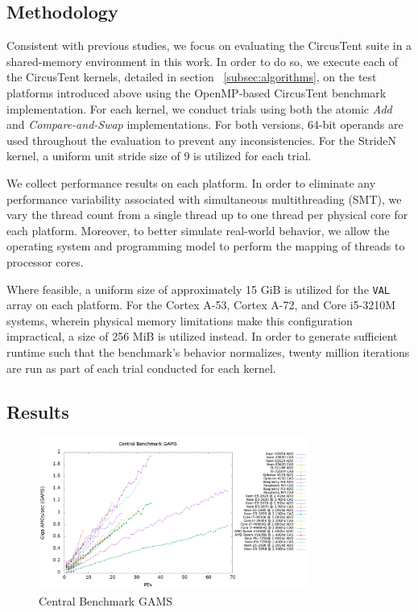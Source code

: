 
\subsection{Methodology}
\label{subsec:methodology}

Consistent with previous studies, we focus on evaluating the CircusTent suite in a shared-memory environment in this work\cite{}.
In order to do so, we execute each of the CircusTent kernels, detailed in section ~\ref{subsec:algorithms}, on the test platforms introduced above using the OpenMP-based CircusTent benchmark implementation. For each kernel, we conduct trials using both the atomic \textit{Add} and \textit{Compare-and-Swap} implementations.
For both versions, 64-bit operands are used throughout the evaluation to prevent any inconsistencies.
For the StrideN kernel, a uniform unit stride size of 9 is utilized for each trial.

We collect performance results on each platform.
In order to eliminate any performance variability associated with simultaneous multithreading (SMT), we vary the thread count from a single thread up to one thread per physical core for each platform.
Moreover, to better simulate real-world behavior, we allow the operating system and programming model to perform the mapping of threads to processor cores.

Where feasible, a uniform size of approximately 15 GiB is utilized for the \texttt{VAL} array on each platform. For the Cortex A-53, Cortex A-72, and Core i5-3210M systems, wherein physical memory limitations make this configuration impractical, a size of 256 MiB is utilized instead.
In order to generate sufficient runtime such that the benchmark's behavior normalizes, twenty million iterations are run as part of each trial conducted for each kernel.


\subsection{Results}
\label{subsec:results}

\begin{figure}[!t]
\centering
\includegraphics[width=3.5in]{figures/CENTRAL_GAMS.png}
\caption{Central Benchmark GAMS}
\label{fig:central_gams}
\end{figure}

